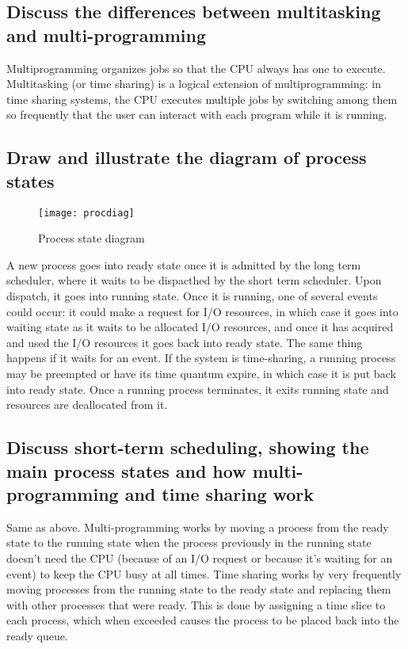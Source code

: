 \documentclass{article}
\begin{document}
\subsection{Discuss the differences between multitasking and multi-programming}
Multiprogramming organizes jobs so that the CPU always has one to execute. Multitasking (or time sharing) is a logical extension of multiprogramming: in time sharing systems, the CPU executes multiple jobs by switching among them so frequently that the user can interact with each program while it is running.

\subsection{Draw and illustrate the diagram of process states}
\begin{figure}[H]
    \centering
    \texttt{[image: procdiag]}
    \caption{Process state diagram}
\end{figure}

A new process goes into ready state once it is admitted by the long term scheduler, where it waits to be dispacthed by the short term scheduler. Upon dispatch, it goes into running state. Once it is running, one of several events could occur: it could make a request for I/O resources, in which case it goes into waiting state as it waits to be allocated I/O resources, and once it has acquired and used the I/O resources it goes back into ready state. The same thing happens if it waits for an event. If the system is time-sharing, a running process may be preempted or have its time quantum expire, in which case it is put back into ready state. Once a running process terminates, it exits running state and resources are deallocated from it.
\subsection{Discuss short-term scheduling, showing the main process states and how multi-programming and time sharing work}
Same as above. Multi-programming works by moving a process from the ready state to the running state when the process previously in the running state doesn't need the CPU (because of an I/O request or because it's waiting for an event) to keep the CPU busy at all times. Time sharing works by very frequently moving processes from the running state to the ready state and replacing them with other processes that were ready. This is done by assigning a time slice to each process, which when exceeded causes the process to be placed back into the ready queue.
\end{document}
